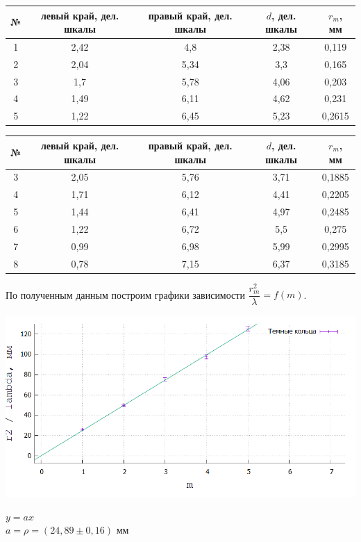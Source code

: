 \documentclass[12pt]{article}
\begin{document}
		\begin{center}
		\begin{tabular}{|c|c|c|c|c|}
			\hline 
			№ & левый край, дел. шкалы & правый край, дел. шкалы & $d$, дел. шкалы  & $r_m$, мм \\ 
			\hline 
			1 & 2,42 & 4,8 & 2,38 & 0,119 \\ 
			\hline 
			2 & 2,04 & 5,34 & 3,3 & 0,165 \\ 
			\hline 
			3 & 1,7 & 5,78 & 4,06 & 0,203 \\ 
			\hline 
			4 & 1,49 & 6,11 & 4,62 & 0,231 \\ 
			\hline 
			5 & 1,22 & 6,45 & 5,23 & 0,2615 \\ 
			\hline 
		\end{tabular} 
	
		\begin{tabular}{|c|c|c|c|c|}
			\hline 
			№ & левый край, дел. шкалы & правый край, дел. шкалы & $d$, дел. шкалы  & $r_m$, мм \\ 
			\hline 
			3 & 2,05 & 5,76 & 3,71 & 0,1885 \\ 
			\hline 
			4 & 1,71 & 6,12 & 4,41 & 0,2205 \\ 
			\hline 
			5 & 1,44 & 6,41 & 4,97 & 0,2485 \\ 
			\hline 
			6 & 1,22 & 6,72 & 5,5 & 0,275 \\ 
			\hline 
			7 & 0,99 & 6,98 & 5,99 & 0,2995 \\ 
			\hline 
			8 & 0,78 & 7,15 & 6,37 & 0,3185 \\
			\hline
		\end{tabular} 
		\end{center}
		
		По полученным данным построим графики зависимости $\dfrac{r_m^2}{\lambda} = f(m)$.
		
		
		\begin{minipage}{.6\textwidth}
			\centering
			\includegraphics[scale=.6]{dark_plot}
		\end{minipage}	
		\begin{minipage}{.3\textwidth}
			$y = ax$\\
			$a = \rho = (24,89 \pm 0,16)$ мм
		\end{minipage}
	
\end{document}
